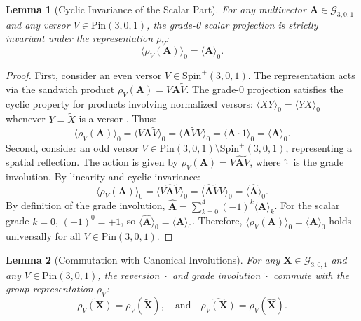 \documentclass[10pt]{article}
\newtheorem{lemma}{Lemma}
\begin{document}
\begin{lemma}[Cyclic Invariance of the Scalar Part]
\label{lem:cyclic_scalar}
For any multivector $\mathbf{A} \in \mathcal{G}_{3,0,1}$ and any versor $V \in \mathrm{Pin}(3,0,1)$, the grade-0 scalar projection is strictly invariant under the representation $\rho_V$:
\begin{equation}
    \langle \rho_V(\mathbf{A}) \rangle_0 = \langle \mathbf{A} \rangle_0.
\end{equation}
\end{lemma}

\begin{proof}
First, consider an even versor $V \in \mathrm{Spin}^+(3,0,1)$. The representation acts via the sandwich product $\rho_V(\mathbf{A}) = V \mathbf{A} \widetilde{V}$. The grade-0 projection satisfies the cyclic property for products involving normalized versors: $\langle X Y \rangle_0 = \langle Y X \rangle_0$ whenever $Y = \widetilde{X}$ is a versor \citep{pga4cs2020}. Thus:
\begin{equation}
    \langle \rho_V(\mathbf{A}) \rangle_0 = \langle V \mathbf{A} \widetilde{V} \rangle_0 = \langle \mathbf{A} \widetilde{V} V \rangle_0 = \langle \mathbf{A} \cdot 1 \rangle_0 = \langle \mathbf{A} \rangle_0.
\end{equation}
Second, consider an odd versor $V \in \mathrm{Pin}(3,0,1) \setminus \mathrm{Spin}^+(3,0,1)$, representing a spatial reflection. The action is given by $\rho_V(\mathbf{A}) = V \widehat{\mathbf{A}} \widetilde{V}$, where $\widehat{\cdot}$ is the grade involution. By linearity and cyclic invariance:
\begin{equation}
    \langle \rho_V(\mathbf{A}) \rangle_0 = \langle V \widehat{\mathbf{A}} \widetilde{V} \rangle_0 = \langle \widehat{\mathbf{A}} \widetilde{V} V \rangle_0 = \langle \widehat{\mathbf{A}} \rangle_0.
\end{equation}
By definition of the grade involution, $\widehat{\mathbf{A}} = \sum_{k=0}^4 (-1)^k \langle \mathbf{A} \rangle_k$. For the scalar grade $k=0$, $(-1)^0 = +1$, so $\langle \widehat{\mathbf{A}} \rangle_0 = \langle \mathbf{A} \rangle_0$. Therefore, $\langle \rho_V(\mathbf{A}) \rangle_0 = \langle \mathbf{A} \rangle_0$ holds universally for all $V \in \mathrm{Pin}(3,0,1)$.
\end{proof}

\begin{lemma}[Commutation with Canonical Involutions]
\label{lem:involution_commute}
For any $\mathbf{X} \in \mathcal{G}_{3,0,1}$ and any $V \in \mathrm{Pin}(3,0,1)$, the reversion $\widetilde{\cdot}$ and grade involution $\widehat{\cdot}$ commute with the group representation $\rho_V$:
\begin{equation}
    \widetilde{\rho_V(\mathbf{X})} = \rho_V(\widetilde{\mathbf{X}}), \quad \text{and} \quad \widehat{\rho_V(\mathbf{X})} = \rho_V(\widehat{\mathbf{X}}).
\end{equation}
\end{lemma}
\end{document}
